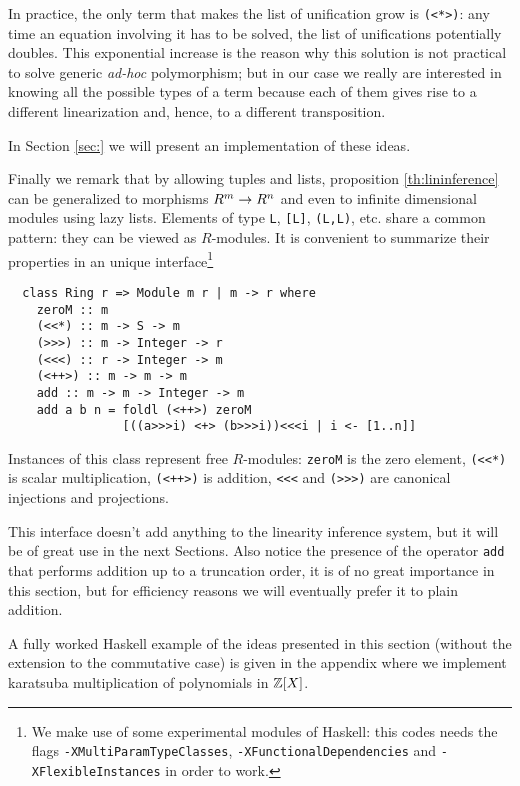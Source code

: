 In practice, the only term that makes the list of unification grow is
\lstinline{(<*>)}: any time an equation involving it has to be solved,
the list of unifications potentially doubles. This exponential
increase is the reason why this solution is not practical to solve
generic \emph{ad-hoc} polymorphism; but in our case we really are
interested in knowing all the possible types of a term because each of
them gives rise to a different linearization and, hence, to a
different transposition.

In Section \ref{sec:} we will present an implementation of these
ideas.

Finally we remark that by allowing tuples and lists, proposition
\ref{th:lininference} can be generalized to morphisms $R^m\rightarrow R^n$ and
even to infinite dimensional modules using lazy lists. Elements of
type \lstinline{L}, \lstinline{[L]}, \lstinline{(L,L)}, etc. share a
common pattern: they can be viewed as $R$-modules. It is convenient to
summarize their properties in an unique interface\footnote{We make use
  of some experimental modules of Haskell: this codes needs the flags
  \lstinline{-XMultiParamTypeClasses},
  \lstinline{-XFunctionalDependencies} and
  \lstinline{-XFlexibleInstances} in order to work.}
\begin{lstlisting}
  class Ring r => Module m r | m -> r where
    zeroM :: m
    (<<*) :: m -> S -> m
    (>>>) :: m -> Integer -> r
    (<<<) :: r -> Integer -> m
    (<++>) :: m -> m -> m
    add :: m -> m -> Integer -> m
    add a b n = foldl (<++>) zeroM
                [((a>>>i) <+> (b>>>i))<<<i | i <- [1..n]]
\end{lstlisting}

Instances of this class represent free $R$-modules: \lstinline{zeroM}
is the zero element, \lstinline{(<<*)} is scalar multiplication,
\lstinline{(<++>)} is addition, \lstinline{<<<} and \lstinline{(>>>)}
are canonical injections and projections. 

This interface doesn't add anything to the linearity inference system,
but it will be of great use in the next Sections.  Also notice the
presence of the operator \lstinline{add} that performs addition up to
a truncation order, it is of no great importance in this section, but
for efficiency reasons we will eventually prefer it to plain addition.

A fully worked Haskell example of the ideas presented in this section
(without the extension to the commutative case) is given in the
appendix where we implement karatsuba multiplication of polynomials in
$\mathbb{Z}[X]$.


%
